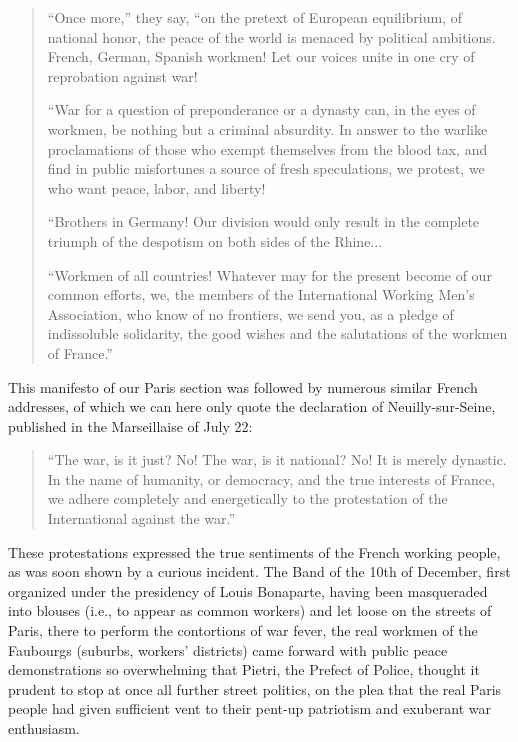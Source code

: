 \documentclass{article}
\begin{document}
\begin{quote}

“Once more,” they say, “on the pretext of European equilibrium, of
national honor, the peace of the world is menaced by political ambitions.
French, German, Spanish workmen! Let our voices unite in one cry of
reprobation against war!


``War for a question of preponderance or a dynasty can, in the eyes of
workmen, be nothing but a criminal absurdity. In answer to the warlike
proclamations of those who exempt themselves from the blood tax, and find
in public misfortunes a source of fresh speculations, we protest, we who
want peace, labor, and liberty!

``Brothers in Germany! Our division would only result in the complete
triumph of the despotism on both sides of the Rhine...

``Workmen of all countries! Whatever may for the present become of our
common efforts, we, the members of the International Working Men’s
Association, who know of no frontiers, we send you, as a pledge of
indissoluble solidarity, the good wishes and the salutations of the
workmen of France.”

\end{quote}

This manifesto of our Paris section was followed by numerous similar
French addresses, of which we can here only quote the declaration of
Neuilly-sur-Seine, published in the Marseillaise of July 22:

\begin{quote}

``The war, is it just? No! The war, is it national? No! It is merely
dynastic. In the name of humanity, or democracy, and the true interests of
France, we adhere completely and energetically to the protestation of the
International against the war.''

\end{quote}

These protestations expressed the true sentiments of the French working
people, as was soon shown by a curious incident. The Band of the 10th of
December, first organized under the presidency of Louis Bonaparte, having
been masqueraded into blouses (i.e., to appear as common workers) and let
loose on the streets of Paris, there to perform the contortions of war
fever, the real workmen of the Faubourgs (suburbs, workers’ districts)
came forward with public peace demonstrations so overwhelming that
Pietri, the Prefect of Police, thought it prudent to stop at once all
further street politics, on the plea that the real Paris people had given
sufficient vent to their pent-up patriotism and exuberant war
enthusiasm.
\end{document}
